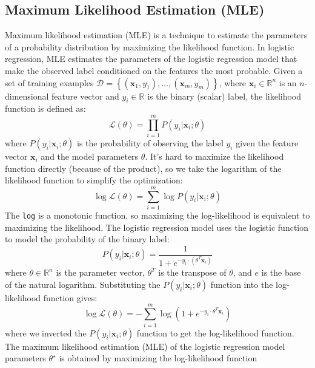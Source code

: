 \documentclass{article}[12pt]
\begin{document}
\subsection{Maximum Likelihood Estimation (MLE)}
Maximum likelihood estimation (MLE) is a technique to estimate the parameters of a probability distribution by maximizing the likelihood function.
In logistic regression, MLE estimates the parameters of the logistic regression model that make the observed label conditioned on the features the most probable.
Given a set of training examples $\mathcal{D} = \left\{\left(\mathbf{x}_{1}, y_{1}\right),\dots,\left(\mathbf{x}_{m}, y_{m}\right)\right\}$, where $\mathbf{x}_{i}\in\mathbb{R}^{n}$ is an $n$-dimensional feature vector and $y_{i}\in\mathbb{R}$ is the binary (scalar) label, the likelihood function is defined as:
\begin{equation}
\mathcal{L}(\theta) = \prod_{i=1}^{m}P(y_{i}|\mathbf{x}_{i};\theta)
\end{equation}
where $P(y_{i}|\mathbf{x}_{i};\theta)$ is the probability of observing the label $y_{i}$ given the feature vector $\mathbf{x}_{i}$ and the model parameters $\theta$.
It's hard to maximize the likelihood function directly (because of the product), so we take the logarithm of the likelihood function to simplify the optimization:
\begin{equation}
\log\mathcal{L}(\theta) = \sum_{i=1}^{m}\log P(y_{i}|\mathbf{x}_{i};\theta)
\end{equation}
The \texttt{log} is a monotonic function, so maximizing the log-likelihood is equivalent to maximizing the likelihood.
The logistic regression model uses the logistic function to model the probability of the binary label:
\begin{equation}
P(y_{i}|\mathbf{x}_{i};\theta) = \frac{1}{1 + e^{-y_{i}\cdot\left(\theta^{T}\mathbf{x}_{i}\right)}}
\end{equation}
where $\theta\in\mathbb{R}^{n}$ is the parameter vector, $\theta^{T}$ is the transpose of $\theta$, and $e$ is the base of the natural logarithm.
Substituting the $P(y_{i}|\mathbf{x}_{i};\theta)$ function into the log-likelihood function gives:
\begin{equation}
\log\mathcal{L}(\theta) = -\sum_{i=1}^{m}\log\left(1 + e^{-y_{i}\cdot\theta^{T}\mathbf{x}_{i}}\right)
\end{equation}
where we inverted the $P(y_{i}|\mathbf{x}_{i};\theta)$ function to get the log-likelihood function.
The maximum likelihood estimation (MLE) of the logistic regression model parameters $\theta^{\star}$ is obtained by maximizing the log-likelihood function
\end{document}
